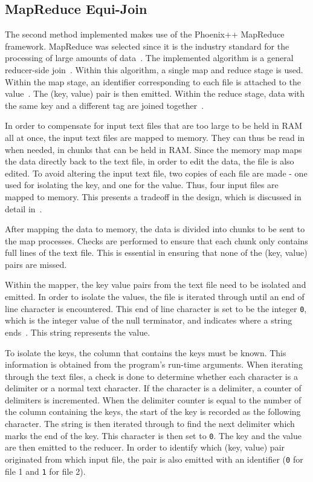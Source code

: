 \documentclass[10pt,twocolumn]{witseiepaper}
\begin{document}
\subsection{MapReduce Equi-Join}
The second method implemented makes use of the Phoenix++ MapReduce framework. MapReduce was selected since it is the industry standard for the processing of large amounts of data~\cite{comparingMPIMapReduce}. The implemented algorithm is a general reducer-side join~\cite{mapReduceJoin}. Within this algorithm, a single map and reduce stage is used. Within the map stage, an identifier corresponding to each file is attached to the value~\cite{mapReduceJoin}. The (key, value) pair is then emitted. Within the reduce stage, data with the same key and a different tag are joined together~\cite{mapReduceJoin}.

In order to compensate for input text files that are too large to be held in RAM all at once, the input text files are mapped to memory. They can thus be read in when needed, in chunks that can be held in RAM. Since the memory map maps the data directly back to the text file, in order to edit the data, the file is also edited. To avoid altering the input text file, two copies of each file are made - one used for isolating the key, and one for the value. Thus, four input files are mapped to memory. This presents a tradeoff in the design, which is discussed in detail in~.

After mapping the data to memory, the data is divided into chunks to be sent to the map processes. Checks are performed to ensure that each chunk only contains full lines of the text file. This is essential in ensuring that none of the (key, value) pairs are missed.

Within the mapper, the key value pairs from the text file need to be isolated and emitted. In order to isolate the values, the file is iterated through until an end of line character is encountered. This end of line character is set to be the integer \texttt{0}, which is the integer value of the null terminator, and indicates where a string ends~\cite{phoenix}. This string represents the value.

To isolate the keys, the column that contains the keys must be known. This information is obtained from the program's run-time arguments. When iterating through the text files, a check is done to determine whether each character is a delimiter or a normal text character. If the character is a delimiter, a counter of delimiters is incremented. When the delimiter counter is equal to the number of the column containing the keys, the start of the key is recorded as the following character. The string is then iterated through to find the next delimiter which marks the end of the key. This character is then set to \texttt{0}. The key and the value are then emitted to the reducer. In order to identify which (key, value) pair originated from which input file, the pair is also emitted with an identifier (\texttt{0} for file 1 and \texttt{1} for file 2).
\end{document}
